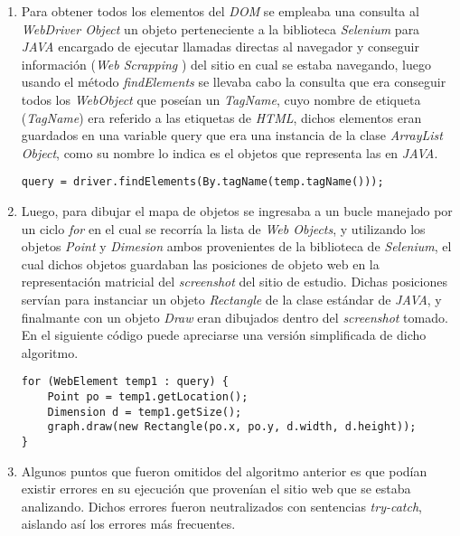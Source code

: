         \begin{enumerate}
         \item Para obtener todos los elementos del \textit{DOM} se empleaba una consulta al 
         \textit{WebDriver Object} un objeto perteneciente a la biblioteca \textit{Selenium} 	
         para
         \textit{JAVA} encargado de ejecutar llamadas directas al navegador y conseguir información
         (\textit{Web Scrapping} \cite{ref8}) del sitio en cual se estaba navegando, luego usando el 
         método \textit{findElements} se llevaba cabo la consulta que era conseguir todos los 
         \textit{WebObject} que poseían un \textit{TagName}, cuyo nombre de etiqueta 
         (\textit{TagName}) era referido a las etiquetas de \textit{HTML}, dichos elementos
         eran guardados en una variable query que era una instancia de la clase  
         \textit{ArrayList Object}, como su nombre lo indica es el objetos que representa las en 
         \textit{JAVA}.
			\begin{lstlisting}[style=Java, caption={Obtención \textit{WebObjects}.}]
           	query = driver.findElements(By.tagName(temp.tagName()));
\end{lstlisting}
		\item Luego, para dibujar el mapa de objetos se ingresaba a un bucle manejado por un ciclo
		\textit{for} en el cual se recorría la lista de \textit{Web Objects}, y utilizando los 
		objetos \textit{Point} y \textit{Dimesion} ambos provenientes de la biblioteca de 
		\textit{Selenium}, el cual dichos objetos guardaban las posiciones de objeto web 
		en la representación matricial del \textit{screenshot} del sitio de estudio. Dichas
		posiciones servían para instanciar un objeto \textit{Rectangle} de la clase estándar
		de \textit{JAVA}, y finalmante con un objeto \textit{Draw} eran dibujados dentro del 
		\textit{screenshot} tomado. En el siguiente código puede apreciarse una versión simplificada
		de dicho algoritmo.
					\begin{lstlisting}[style=Java, caption={Algoritmo mapa de objetos simplificado.}]
for (WebElement temp1 : query) {
	Point po = temp1.getLocation();
    Dimension d = temp1.getSize();
    graph.draw(new Rectangle(po.x, po.y, d.width, d.height));
}
\end{lstlisting}
		\item Algunos puntos que fueron omitidos del algoritmo anterior es que podían existir 
		errores en su ejecución que provenían el sitio web que se estaba analizando. Dichos errores fueron 
		neutralizados con sentencias \textit{try-catch}, aislando así los errores más frecuentes.

\end{enumerate}
